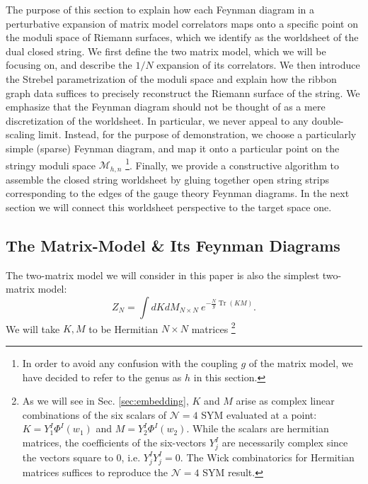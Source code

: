 \documentclass[english]{article}
\DeclareMathOperator{\Tr}{Tr}
\renewcommand{\>}{\rangle}
\newcommand{\<}{\langle}
\renewcommand{\(}{\left(}
\renewcommand{\)}{\right)}
\begin{document}
The purpose of this section to explain how each Feynman diagram in a perturbative expansion of matrix model correlators maps onto a specific point on the moduli space of Riemann surfaces, which we identify as the worldsheet of the dual closed string. We first define the two matrix model, which we will be focusing on, and describe the $1/N$ expansion of its correlators. We then introduce the Strebel parametrization of the moduli space and explain how the ribbon graph data suffices to precisely reconstruct the Riemann surface of the string. We emphasize that the Feynman diagram should not be thought of as a mere discretization of the worldsheet. In particular, we never appeal to any double-scaling limit.  Instead, for the purpose of demonstration, we choose a particularly simple (sparse) Feynman diagram, and map it onto a particular point on the stringy moduli space $\mathcal{M}_{h,n}$ \footnote{In order to avoid any confusion with the coupling $g$ of the matrix model, we have decided to refer to the genus as $h$ in this section.}. Finally, we provide a constructive algorithm to assemble the closed string worldsheet by gluing together open string strips corresponding to the edges of the gauge theory Feynman diagrams. In the next section we will connect this worldsheet perspective to the target space one.

\subsection{The Matrix-Model \& Its Feynman Diagrams } \label{sec:MatrixFDs}

The two-matrix model we will consider in this paper is also the simplest two-matrix model: 
\begin{equation}
   Z_{N}= \int dK dM_{N \times N} \ e^{-\frac{N}{g} \Tr(KM)}.
\end{equation}
We will take $K,M$ to be Hermitian $N\times N$ matrices \footnote{As we will see in Sec. \ref{sec:embedding}, $K$ and $M$ arise as complex linear combinations of the six scalars of $\mathcal{N}=4$ SYM evaluated at a point: $K = Y_{1}^{I} \Phi^{I}(w_1)$ and $M = Y_{2}^{I} \Phi^{I}(w_2)$. While the scalars are hermitian matrices, the coefficients of the six-vectors $Y_{j}^{I}$ are necessarily complex since the vectors square to 0, i.e. $Y_{j}^{I}Y_{j}^{I}=0$. The Wick combinatorics for Hermitian matrices suffices to reproduce the $\mathcal{N}=4$ SYM result. } 
\end{document}
